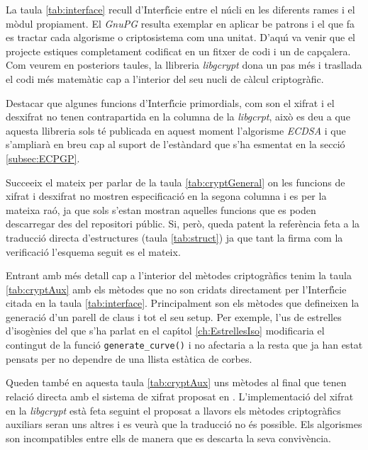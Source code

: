 \documentclass[12pt,twoside,catalan,a4paper]{book}%
\numberwithin{figure}{section}		%
\theoremstyle{definition}   			%
\theoremstyle{saltolinea}   			%
\begin{document}
La taula \ref{tab:interface} recull d'Interf\'{\i}cie entre el n\'ucli en les diferents rames i el m\`odul propiament. El \emph{GnuPG} resulta exemplar en aplicar be patrons i el que fa es tractar cada algorisme o criptosistema com una unitat. D'aqu\'{\i} va venir que el projecte \cite{BM04} estiques completament codificat en un fitxer de codi i un de cap\c{c}alera. Com veurem en posteriors taules, la llibreria \emph{libgcrypt} dona un pas m\'es i trasllada el codi m\'es matem\`atic cap a l'interior del seu nucli de c\`alcul criptogr\`afic.

Destacar que algunes funcions d'Interf\'{\i}cie primordials, com son el xifrat i el desxifrat no tenen contrapartida en la columna de la \emph{libgcrpt}, aix\`o es deu a que aquesta llibreria sols t\'e publicada en aquest moment l'algorisme \emph{ECDSA} i que s'ampliar\`a en breu cap al suport de l'est\`andard \cite{ECPGP} que s'ha esmentat en la secci\'o \ref{subsec:ECPGP}.

Succeeix el mateix per parlar de la taula \ref{tab:cryptGeneral} on les funcions de xifrat i desxifrat no mostren especificaci\'o en la segona columna i es per la mateixa ra\'o, ja que sols s'estan mostran aquelles funcions que es poden descarregar des del repositori p\'ublic. Si, per\`o, queda patent la refer\`encia feta a la traducci\'o directa d'estructures (taula \ref{tab:struct}) ja que tant la firma com la verificaci\'o l'esquema seguit es el mateix.

Entrant amb m\'es detall cap a l'interior del m\`etodes criptogr\`afics tenim la taula \ref{tab:cryptAux} amb els m\`etodes que no son cridats directament per l'Interf\'{\i}cie citada en la taula \ref{tab:interface}. Principalment son els m\`etodes que defineixen la generaci\'o d'un parell de claus i tot el seu setup. Per exemple, l'us de estrelles d'isog\`enies del que s'ha parlat en el cap\'{\i}tol \ref{ch:EstrellesIso} modificaria el contingut de la funci\'o {\tt generate\_curve()} i no afectaria a la resta que ja han estat pensats per no dependre de una llista est\`atica de corbes.

Queden tamb\'e en aquesta taula \ref{tab:cryptAux} uns m\`etodes al final que tenen relaci\'o directa amb el sistema de xifrat proposat en \cite{BM06}. L'implementaci\'o del xifrat en la \emph{libgcrypt} est\`a feta seguint el proposat a \cite{ECPGP} llavors els m\`etodes criptogr\`afics auxiliars seran uns altres i es veur\`a que la traducci\'o no \'es possible. Els algorismes son incompatibles entre ells de manera que es descarta la seva conviv\`encia.
\end{document}

